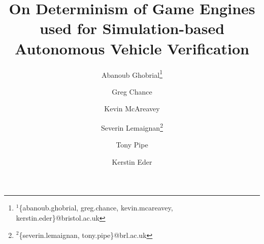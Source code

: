 \documentclass[letterpaper, 10 pt, journal, twoside]{IEEEtran}
\begin{document}
\title{On Determinism of Game Engines used for Simulation-based Autonomous Vehicle Verification}
\author[1,3]{Abanoub Ghobrial\thanks{$^{1}${\footnotesize \{abanoub.ghobrial, greg.chance, kevin.mcareavey, kerstin.eder\}@bristol.ac.uk}}}
\author[1,3]{Greg Chance}
\author[1,3]{Kevin McAreavey}
\author[2,3]{Severin Lemaignan\thanks{$^{2}${\footnotesize \{severin.lemaignan, tony.pipe\}@brl.ac.uk}}}
\author[2,3]{Tony Pipe}
\author[1,3]{Kerstin Eder}
\maketitle
\end{document}
